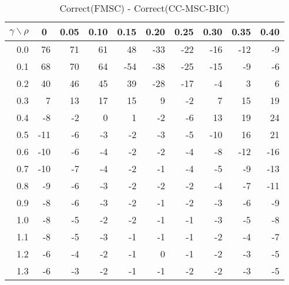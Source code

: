 \documentclass[12pt]{article}
\begin{document}
%
\begin{table}[!tbp]
\caption{Correct(FMSC) - Correct(CC-MSC-BIC)}
 \begin{center}
 \begin{tabular}{r|rrrrrrrrr}\hline\hline
\multicolumn{1}{c|}{$\gamma\backslash\rho$}&\multicolumn{1}{c}{0}&\multicolumn{1}{c}{0.05}&\multicolumn{1}{c}{0.10}&\multicolumn{1}{c}{0.15}&\multicolumn{1}{c}{0.20}&\multicolumn{1}{c}{0.25}&\multicolumn{1}{c}{0.30}&\multicolumn{1}{c}{0.35}&\multicolumn{1}{c}{0.40}\tabularnewline
\hline



0.0& 76&71&61& 48&-33&-22&-16&-12& -9\tabularnewline
0.1& 68&70&64&-54&-38&-25&-15& -9& -6\tabularnewline
0.2& 40&46&45& 39&-28&-17& -4&  3&  6\tabularnewline
0.3&  7&13&17& 15&  9& -2&  7& 15& 19\tabularnewline
0.4& -8&-2& 0&  1& -2& -6& 13& 19& 24\tabularnewline
0.5&-11&-6&-3& -2& -3& -5&-10& 16& 21\tabularnewline
0.6&-10&-6&-4& -2& -2& -4& -8&-12&-16\tabularnewline
0.7&-10&-7&-4& -2& -1& -4& -5& -9&-13\tabularnewline
0.8& -9&-6&-3& -2& -2& -2& -4& -7&-11\tabularnewline
0.9& -8&-6&-3& -2& -1& -2& -3& -6& -9\tabularnewline
1.0& -8&-5&-2& -2& -1& -1& -3& -5& -8\tabularnewline
1.1& -8&-5&-3& -1& -1& -1& -2& -4& -7\tabularnewline
1.2& -6&-4&-2& -1&  0& -1& -2& -3& -5\tabularnewline
1.3& -6&-3&-2& -1& -1& -2& -2& -3& -5\tabularnewline
\hline
\end{tabular}

\end{center}

\end{table}
\end{document}
